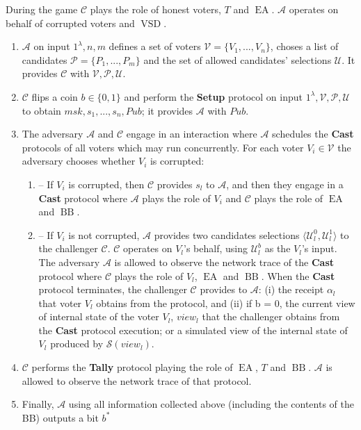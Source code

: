 \documentclass[12pt]{article}
\DeclareMathOperator{\vsd}{VSD}
\DeclareMathOperator{\ea}{EA}
\DeclareMathOperator{\bb}{BB}
\begin{document}
 During the game $\mathcal{C}$ plays the role of honest voters, $T$ and $\ea$. $\mathcal{A}$ operates on behalf of corrupted voters and $\vsd$. 
\begin{enumerate}
\item $\mathcal{A}$ on input $1^{\lambda},n,m$ defines a set of voters  $\mathcal{V} = \{V_1,...,V_n\}$, choses a list of candidates  $\mathcal{P} = \{P_1,...,P_m\}$ and the set of allowed candidates' selections $\mathcal{U}$.  It provides $\mathcal{C}$ with $\mathcal{V}, \mathcal{P}, \mathcal{U}$.
\item $\mathcal{C}$ flips a coin $b\in \{0,1\}$ and perform the \textbf{Setup} protocol on input $1^{\lambda},\mathcal{V}, \mathcal{P}, \mathcal{U}$ to obtain $msk,s_1,...,s_n, Pub$; it provides  $\mathcal{A}$ with $Pub$. 
\item The adversary $\mathcal{A}$  and $\mathcal{C}$ engage in an interaction where $\mathcal{A}$ schedules the \textbf{Cast} protocols of all voters which may run concurrently. For each voter  $V_i \in \mathcal{V}$ the adversary chooses whether $V_i$ is corrupted:
\begin{enumerate}
\item[] -- If $V_i$ is corrupted, then $\mathcal{C}$ provides $s_l$ to $\mathcal{A}$, and then they engage in a  \textbf{Cast} protocol where $\mathcal{A}$ plays the role of $V_i$ and  $\mathcal{C}$ plays the role of $\ea$ and $\bb$.
\item[] --  If $V_i$ is not corrupted, $\mathcal{A}$ provides two candidates selections $\langle \mathcal{U}^0_l , \mathcal{U}^1_l \rangle$ to the challenger $\mathcal{C}$. $\mathcal{C}$ operates on $V_l$'s behalf, using  $\mathcal{U}^b_l$ as the $V_l$'s input. The adversary  $\mathcal{A}$ is allowed to observe the network trace of the \textbf{Cast} protocol where  $\mathcal{C}$ plays the role of $V_l$, $\ea$ and $\bb$. When the  \textbf{Cast} protocol terminates, the challenger  $\mathcal{C}$ provides to $\mathcal{A}$: (i) the receipt $\alpha_l$ that voter $V_l$ obtains from the protocol, and (ii) if b = 0, the current view of internal state of the voter $V_l$, $view_l$ that the challenger obtains from the \textbf{Cast} protocol execution; or  a simulated view of the internal state of $V_l$ produced by $\mathcal{S}(view_l)$.
\end{enumerate}
\item $\mathcal{C}$ performs the  \textbf{Tally} protocol playing the role of $\ea$, $T$  and $\bb$. $\mathcal{A}$ is allowed to observe the network trace of that protocol. 
\item Finally, $\mathcal{A}$ using all information collected above (including the contents of the BB) outputs a bit $b^*$
\end{enumerate}
\end{document}
